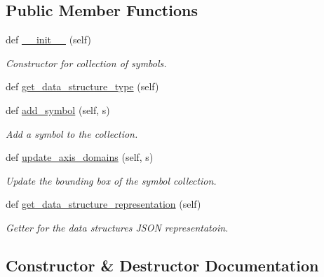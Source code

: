 \subsection*{Public Member Functions}
\begin{DoxyCompactItemize}
\item 
def \mbox{\hyperlink{classbridges_1_1symbol__collection_1_1_symbol_collection_a7ba838d831a2dce6d74fe920c7de52fd}{\+\_\+\+\_\+init\+\_\+\+\_\+}} (self)
\begin{DoxyCompactList}\small\item\em Constructor for collection of symbols. \end{DoxyCompactList}\item 
def \mbox{\hyperlink{classbridges_1_1symbol__collection_1_1_symbol_collection_a84a2d68da2df79389b6bec06ee99f72d}{get\+\_\+data\+\_\+structure\+\_\+type}} (self)
\item 
def \mbox{\hyperlink{classbridges_1_1symbol__collection_1_1_symbol_collection_a11e36a56b1d7dbf23175d4b1ab3cd378}{add\+\_\+symbol}} (self, s)
\begin{DoxyCompactList}\small\item\em Add a symbol to the collection. \end{DoxyCompactList}\item 
def \mbox{\hyperlink{classbridges_1_1symbol__collection_1_1_symbol_collection_af0906b48ee3ee868bb7779561d3f710c}{update\+\_\+axis\+\_\+domains}} (self, s)
\begin{DoxyCompactList}\small\item\em Update the bounding box of the symbol collection. \end{DoxyCompactList}\item 
def \mbox{\hyperlink{classbridges_1_1symbol__collection_1_1_symbol_collection_a09fb16fe5f14457654e5f2680131ccc9}{get\+\_\+data\+\_\+structure\+\_\+representation}} (self)
\begin{DoxyCompactList}\small\item\em Getter for the data structure\textquotesingle{}s J\+S\+ON representatoin. \end{DoxyCompactList}\end{DoxyCompactItemize}


\subsection{Constructor \& Destructor Documentation}
\mbox{\label{classbridges_1_1symbol__collection_1_1_symbol_collection_a7ba838d831a2dce6d74fe920c7de52fd}} 

